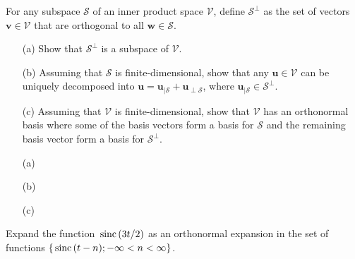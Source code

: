 \documentclass{assignment}
\begin{document}
\begin{prob}
    For any subspace $\mathcal{S}$ of an inner product space $\mathcal{V}$, define $\mathcal{S}^{\perp}$ as the set of vectors $\bm{v}\in\mathcal{V}$ that are orthogonal to all $\bm{w}\in\mathcal{S}$.
    \begin{itemize}
        \item[(a)] Show that $\mathcal{S}^{\perp}$ is a subspace of $\mathcal{V}$.
        \item[(b)] Assuming that $\mathcal{S}$ is finite-dimensional, show that any $\bm{u}\in\mathcal{V}$ can be uniquely decomposed into $\bm{u}=\bm{u}_{\vert\mathcal{S}}+\bm{u}_{\perp\mathcal{S}}$, where $\bm{u}_{\vert\mathcal{S}}\in\mathcal{S}^{\perp}$.
        \item[(c)] Assuming that $\mathcal{V}$ is finite-dimensional, show that $\mathcal{V}$ has an orthonormal basis where some of the basis vectors form a basis for $\mathcal{S}$ and the remaining basis vector form a basis for $\mathcal{S}^{\perp}$.
    \end{itemize}
\end{prob}
\begin{sol}
    \begin{itemize}
        \item[(a)] 
        \item[(b)] 
        \item[(c)] 
    \end{itemize}
\end{sol}

\begin{prob}
    Expand the function $\,\text{sinc}\,(3t/2)$ as an orthonormal expansion in the set of functions $\{\,\text{sinc}\,(t-n);-\infty<n<\infty\}$.
\end{prob}
\begin{sol}
\end{sol}
\end{document}
